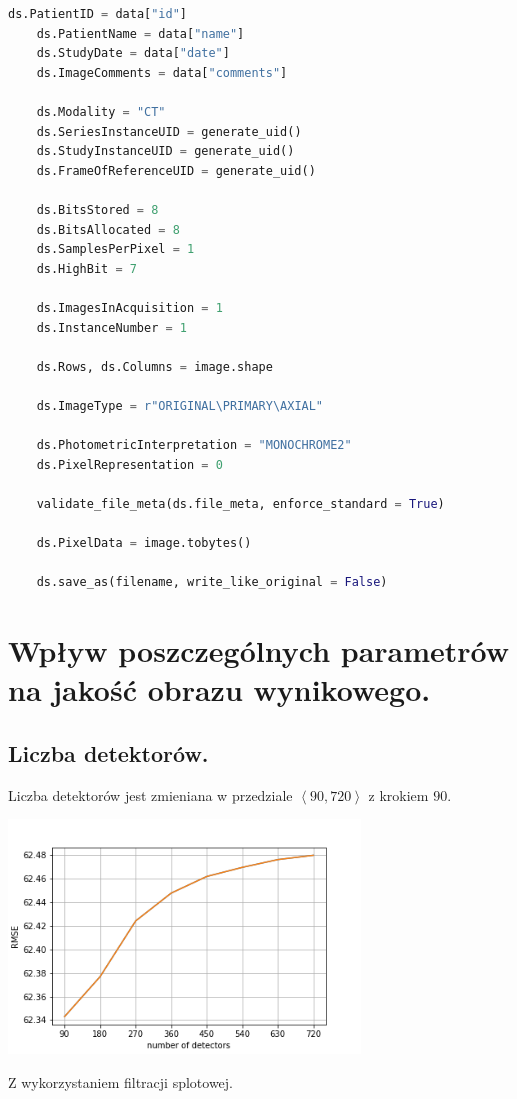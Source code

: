 \documentclass[a4paper, 11pt]{article}
\begin{document}
\begin{lstlisting}[language = Python, caption = Obsługa DICOM, label = lst:dicom]
    ds.PatientID = data["id"]
    ds.PatientName = data["name"]
    ds.StudyDate = data["date"]
    ds.ImageComments = data["comments"]

    ds.Modality = "CT"
    ds.SeriesInstanceUID = generate_uid()
    ds.StudyInstanceUID = generate_uid()
    ds.FrameOfReferenceUID = generate_uid()

    ds.BitsStored = 8
    ds.BitsAllocated = 8
    ds.SamplesPerPixel = 1
    ds.HighBit = 7

    ds.ImagesInAcquisition = 1
    ds.InstanceNumber = 1

    ds.Rows, ds.Columns = image.shape

    ds.ImageType = r"ORIGINAL\PRIMARY\AXIAL"

    ds.PhotometricInterpretation = "MONOCHROME2"
    ds.PixelRepresentation = 0

    validate_file_meta(ds.file_meta, enforce_standard = True)

    ds.PixelData = image.tobytes()

    ds.save_as(filename, write_like_original = False)
\end{lstlisting}

\newpage
\section{Wpływ poszczególnych parametrów na jakość obrazu wynikowego.}
\subsection{Liczba detektorów.}

Liczba detektorów jest zmieniana w przedziale $\left<90, 720 \right>$ z krokiem $90$.

\begin{center}
	\includegraphics[width=0.7\textwidth]{detectors.png}
	
	Z wykorzystaniem filtracji splotowej.
\end{center}
\end{document}
